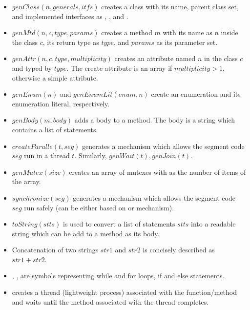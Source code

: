 \begin{itemize}
	\item $genClass(n, generals, itfs)$ creates a class with its name, parent class set, and implemented interfaces as , , and .
	
	\item $genMtd(n, c, type, params)$ creates a method $m$ with its name as $n$ inside the class $c$, its return type as $type$, and $params$ as its parameter set.
	
	\item $genAttr(n, c, type, multiplicity)$ creates an attribute named $n$ in the class $c$ and typed by $type$. The create attribute is an array if $multiplicity > 1$, otherwise a simple attribute.
	
	\item $genEnum(n)$ and $genEnumLit(enum, n)$ create an enumeration and its enumeration literal, respectively.
	
	\item $genBody(m, body)$ adds a body to a method. The body is a string which contains a list of statements.
	
	\item $createParalle(t, seg)$ generates a mechanism which allows the segment code $seg$ run in a thread $t$. Similarly, $genWait(t), genJoin(t)$.
	
	\item $genMutex(size)$ creates an array of mutexes with  as the number of items of the array. 
	
	\item $synchronize(seg)$ generates a mechanism which allows the segment code $seg$ run safely (can be either based on  or  mechanism).
	
	\item $toString(stts)$ is used to convert a list of statements $stts$ into a readable string which can be add to a method as its body.
	
	\item Concatenation of two strings $str1$ and $str2$ is concisely described as $str1 + str2$.
	
	\item {},  ,  are symbols representing while and for loops, if and else statements.
	
	\item {} creates a thread (lightweight process) associated with the function/method  and  waits until the method associated with the thread  completes.
\end{itemize} 

